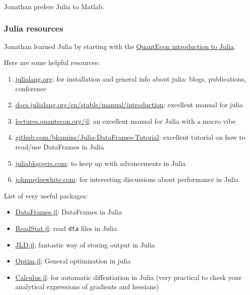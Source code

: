 Jonathan prefers Julia to Matlab.

\subsubsection{Julia resources}
Jonathan learned Julia by starting with the \href{https://lectures.quantecon.org/jl/index_learning_julia.html}{QuantEcon introduction to Julia}.

Here are some helpful resources:
\begin{enumerate}
\item \href{https://julialang.org}{julialang.org}: for installation and general info about julia: blogs, publications, conference
\item \href{https://docs.julialang.org/en/stable/manual/introduction/}{docs.julialang.org/en/stable/manual/introduction}: excellent manual for julia
\item \href{https://lectures.quantecon.org/jl/}{lectures.quantecon.org/jl}: an excellent manual for Julia with a macro vibe
\item \href{https://github.com/bkamins/Julia-DataFrames-Tutorial}{github.com/bkamins/Julia-DataFrames-Tutorial}: excellent tutorial on how to read/use DataFrames in Julia
\item \href{https://www.juliabloggers.com/}{juliabloggers.com}: to keep up with advancements in Julia
\item \href{http://www.johnmyleswhite.com/}{johnmyleswhite.com}: for interesting discussions about performance in Julia
\end{enumerate}

List of very useful packages:
\begin{itemize}
\item \href{https://github.com/JuliaData/DataFrames.jl}{DataFrames.jl}: DataFrames in Julia
\item \href{https://github.com/davidanthoff/ReadStat.jl}{ReadStat.jl}: read \texttt{dta} files in Julia
\item \href{https://github.com/JuliaIO/JLD.jl}{JLD.jl}: fantastic way of storing output in Julia
\item \href{https://github.com/JuliaNLSolvers/Optim.jl}{Optim.jl}: General optimization in julia
\item \href{https://github.com/johnmyleswhite/Calculus.jl}{Calculus.jl}: for automatic diffentiation in Julia (very practical to check your analytical expressions of gradients and hessians)
\end{itemize}

